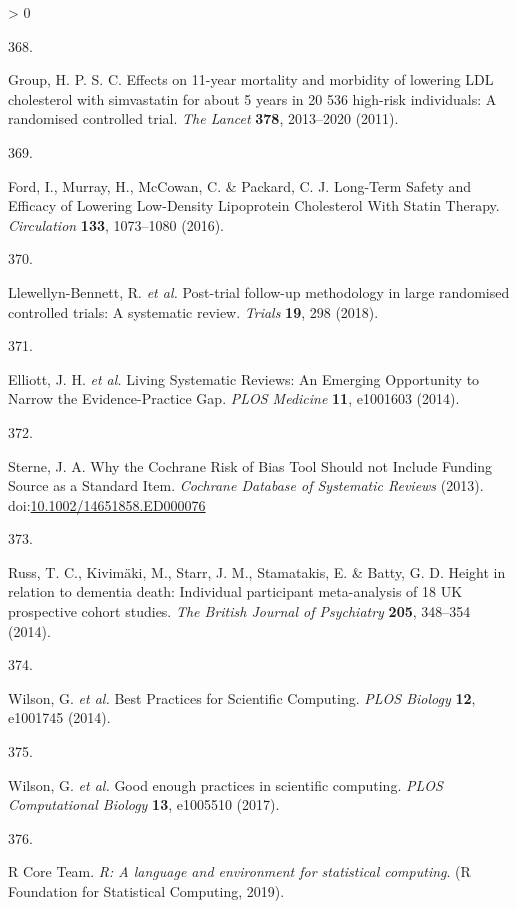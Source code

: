 \documentclass[a4paper, twoside]{templates/ociamthesis}
\newlength{\cslhangindent}
\newlength{\csllabelwidth}
\newenvironment{CSLReferences}[3] %
 {%
  \setlength{\parindent}{0pt}
  \ifodd #1 \everypar{\setlength{\hangindent}{\cslhangindent}}\ignorespaces\fi
  \ifnum #2 > 0
  \setlength{\parskip}{#2\baselineskip}
  \fi
 }%
 {}
\newcommand{\CSLLeftMargin}[1]{\parbox[t]{\maxof{\widthof{#1}}{\csllabelwidth}}{#1}}
\newcommand{\CSLRightInline}[1]{\parbox[t]{\linewidth - \csllabelwidth}{#1}}
\begin{document}
\begin{CSLReferences}{0}{0}
\leavevmode\hypertarget{ref-group2011}{}%
\CSLLeftMargin{368. }
\CSLRightInline{Group, H. P. S. C. Effects on 11-year mortality and morbidity of lowering {LDL} cholesterol with simvastatin for about 5 years in 20 536 high-risk individuals: A randomised controlled trial. \emph{The Lancet} \textbf{378}, 2013--2020 (2011).}

\leavevmode\hypertarget{ref-ford2016}{}%
\CSLLeftMargin{369. }
\CSLRightInline{Ford, I., Murray, H., McCowan, C. \& Packard, C. J. Long-{Term Safety} and {Efficacy} of {Lowering Low}-{Density Lipoprotein Cholesterol With Statin Therapy}. \emph{Circulation} \textbf{133}, 1073--1080 (2016).}

\leavevmode\hypertarget{ref-llewellyn-bennett2018}{}%
\CSLLeftMargin{370. }
\CSLRightInline{Llewellyn-Bennett, R. \emph{et al.} Post-trial follow-up methodology in large randomised controlled trials: A systematic review. \emph{Trials} \textbf{19}, 298 (2018).}

\leavevmode\hypertarget{ref-elliott2014}{}%
\CSLLeftMargin{371. }
\CSLRightInline{Elliott, J. H. \emph{et al.} Living {Systematic Reviews}: An {Emerging Opportunity} to {Narrow} the {Evidence}-{Practice Gap}. \emph{PLOS Medicine} \textbf{11}, e1001603 (2014).}

\leavevmode\hypertarget{ref-sterne2013}{}%
\CSLLeftMargin{372. }
\CSLRightInline{Sterne, J. A. Why the {Cochrane Risk} of {Bias Tool Should} not {Include Funding Source} as a {Standard Item}. \emph{Cochrane Database of Systematic Reviews} (2013). doi:\href{https://doi.org/10.1002/14651858.ED000076}{10.1002/14651858.ED000076}}

\leavevmode\hypertarget{ref-russ2014}{}%
\CSLLeftMargin{373. }
\CSLRightInline{Russ, T. C., Kivimäki, M., Starr, J. M., Stamatakis, E. \& Batty, G. D. Height in relation to dementia death: Individual participant meta-analysis of 18 {UK} prospective cohort studies. \emph{The British Journal of Psychiatry} \textbf{205}, 348--354 (2014).}

\leavevmode\hypertarget{ref-wilson2014}{}%
\CSLLeftMargin{374. }
\CSLRightInline{Wilson, G. \emph{et al.} Best {Practices} for {Scientific Computing}. \emph{PLOS Biology} \textbf{12}, e1001745 (2014).}

\leavevmode\hypertarget{ref-wilson2017}{}%
\CSLLeftMargin{375. }
\CSLRightInline{Wilson, G. \emph{et al.} Good enough practices in scientific computing. \emph{PLOS Computational Biology} \textbf{13}, e1005510 (2017).}

\leavevmode\hypertarget{ref-R-base}{}%
\CSLLeftMargin{376. }
\CSLRightInline{R Core Team. \emph{R: A language and environment for statistical computing}. ({R Foundation for Statistical Computing}, 2019).}


\end{CSLReferences}
\end{document}
